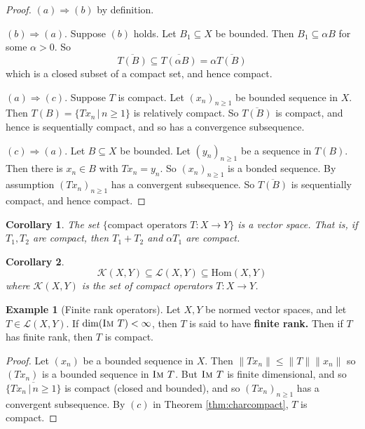 \documentclass[justified]{tufte-book}
\theoremstyle{plain}%
\newtheorem*{cor}{Corollary}
\theoremstyle{definition}
\newtheorem{exmp}[thm]{Example}
\theoremstyle{remark}
\newcommand{\given}{ \, | \,}
\newcommand{\im}{\textsc{Im\ }}
\begin{document}
\begin{proof}
  $(a) \Rightarrow (b)$ by definition.
  
  $(b) \Rightarrow (a)$.  Suppose $(b)$ holds.  Let $B_1 \subseteq X$ be bounded.  Then $B_1 \subseteq \alpha B$ for some $\alpha > 0$.  So \[
      \overline{T(B)} \subseteq \overline{T(\alpha B)} = \alpha \overline{T(B)}
  \] which is a closed subset of a compact set, and hence compact.  
  
  $(a) \Rightarrow (c)$.  Suppose $T$ is compact.  Let $(x_n)_{n \geq 1}$ be bounded sequence in $X$.  Then $T(B) = \{ Tx_n \given n \geq 1 \}$ is relatively compact.  So $\overline{T(B)}$ is compact, and hence is sequentially compact, and so has a convergence subsequence.
  
  $(c) \Rightarrow (a)$.  Let $B \subseteq X$ be bounded.  Let $(y_n)_{n \geq 1}$ be a sequence in $T(B)$.  Then there is $x_n \in B$ with $Tx_n = y_n$.  So $(x_n)_{n \geq 1}$ is a bonded sequence.  By assumption $(Tx_n)_{n \geq 1}$ has a convergent subsequence.  So $\overline{T(B)}$ is sequentially compact, and hence compact.
\end{proof}

\begin{cor}
  The set $\{ \text{compact operators $T : X \rightarrow Y$}\}$ is a vector space.  That is, if $T_1, T_2$ are compact, then $T_1 + T_2$ and $\alpha T_1$ are compact.
\end{cor}


\begin{cor}
  \[
      \mathcal K(X,Y) \subseteq \mathcal L(X, Y) \subseteq \text{Hom}(X,Y)
  \] where $\mathcal K(X,Y)$ is the set of compact operators $T : X \rightarrow Y$. 
\end{cor}

\begin{exmp}[Finite rank operators]  
  Let $X, Y$ be normed vector spaces, and let $T \in \mathcal L(X,Y)$.  If $\dim(\im T) < \infty$, then $T$ is said to have \textbf{finite rank.}  Then if $T$ has finite rank, then $T$ is compact.
\end{exmp}

\begin{proof}
  Let $(x_n)$ be a bounded sequence in $X$.  Then $\| Tx_n \| \leq \| T \| \| x_n \|$ so $(Tx_n)$ is a bounded sequence in $\im T$.  But $\im T$ is finite dimensional, and so $\overline{ \{ Tx_n \given n \geq 1 \}}$ is compact (closed and bounded), and so $(Tx_n)_{n \geq 1}$ has a convergent subsequence.  By $(c)$ in Theorem \ref{thm:charcompact}, $T$ is compact. 
\end{proof}
\end{document}
